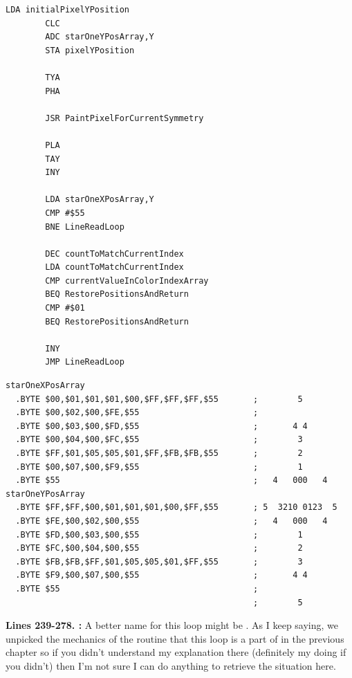 {\begin{lstlisting}[caption=The core pattern-painting loop.]
        LDA initialPixelYPosition
        CLC 
        ADC starOneYPosArray,Y
        STA pixelYPosition

        TYA 
        PHA 

        JSR PaintPixelForCurrentSymmetry

        PLA 
        TAY 
        INY 

        LDA starOneXPosArray,Y
        CMP #$55
        BNE LineReadLoop

        DEC countToMatchCurrentIndex
        LDA countToMatchCurrentIndex
        CMP currentValueInColorIndexArray
        BEQ RestorePositionsAndReturn
        CMP #$01
        BEQ RestorePositionsAndReturn

        INY 
        JMP LineReadLoop

\end{lstlisting}
\begin{lstlisting}[basicstyle=\tiny]
starOneXPosArray
  .BYTE $00,$01,$01,$01,$00,$FF,$FF,$FF,$55       ;        5       
  .BYTE $00,$02,$00,$FE,$55                       ;                
  .BYTE $00,$03,$00,$FD,$55                       ;       4 4      
  .BYTE $00,$04,$00,$FC,$55                       ;        3       
  .BYTE $FF,$01,$05,$05,$01,$FF,$FB,$FB,$55       ;        2       
  .BYTE $00,$07,$00,$F9,$55                       ;        1       
  .BYTE $55                                       ;   4   000   4  
starOneYPosArray
  .BYTE $FF,$FF,$00,$01,$01,$01,$00,$FF,$55       ; 5  3210 0123  5
  .BYTE $FE,$00,$02,$00,$55                       ;   4   000   4  
  .BYTE $FD,$00,$03,$00,$55                       ;        1       
  .BYTE $FC,$00,$04,$00,$55                       ;        2       
  .BYTE $FB,$FB,$FF,$01,$05,$05,$01,$FF,$55       ;        3       
  .BYTE $F9,$00,$07,$00,$55                       ;       4 4      
  .BYTE $55                                       ;                
                                                  ;        5       
\end{lstlisting}
\clearpage

\textbf{Lines 239-278. :} A better name for this loop might be . As I keep saying, we unpicked the mechanics
of the  routine that this loop is a part of in the previous chapter so if you didn't understand my explanation there (definitely my doing if you didn't)
then I'm not sure I can do anything to retrieve the situation here.

}
